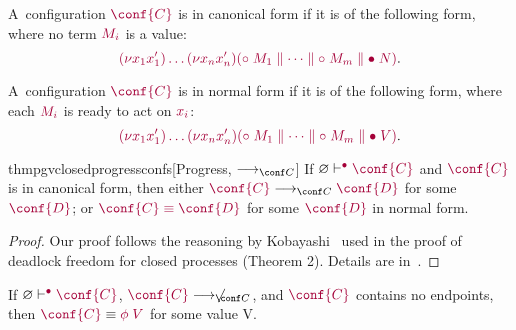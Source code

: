 \documentclass[main.tex]{subfiles}
\begin{document}
\begin{compacttheorems}
  \begin{definition}
    \label{def:pgv-canonical-forms}
    A~configuration $\tm{\conf{C}}$ is in canonical form if it is of the following form, where no term $\tm{M_i}$ is a value:
    \[
      \tm{\res{x_1}{x'_1}{\dots\res{x_n}{x'_n}{(\child\;M_1\parallel\dots\parallel\child\;M_m\parallel\main\;N)}}}.
    \]
  \end{definition}
  \begin{definition}
    A~configuration $\tm{\conf{C}}$ is in normal form if it is of the following form, where each $\tm{M_i}$ is ready to act on $\tm{x_i}$:
    \[
      \tm{\res{x_1}{x'_1}{\dots\res{x_n}{x'_n}{(\child\;M_1\parallel\dots\parallel\child\;M_m\parallel\main\;V)}}}.
    \]
  \end{definition}
  \begin{restatabletheorem}{thmpgvclosedprogressconfs}[Progress, $\cred$]
    \label{thm:pgv-closed-progress-confs}
    If $\cseq[\main]{\emptyenv}{\conf{C}}$ and $\tm{\conf{C}}$ is in canonical form, then either $\tm{\conf{C}}\cred\tm{\conf{D}}$ for some $\tm{\conf{D}}$; or $\tm{\conf{C}\equiv\conf{D}}$ for some $\tm{\conf{D}}$ in normal form.
  \end{restatabletheorem}
  \begin{proof}
    Our proof follows the reasoning by Kobayashi~\cite{kobayashi06} used in the proof of deadlock freedom for closed processes (Theorem 2). Details are in~.
  \end{proof}
  \begin{corollary}
    \label{cor:pgv-closed-progress}
    If $\cseq[\main]{\emptyenv}{\conf{C}}$, $\tm{\conf{C}}\centernot\cred$, and $\tm{\conf{C}}$ contains no endpoints, then $\tm{\conf{C}}\equiv\tm{\phi\;V}$ for some value V.
  \end{corollary}
\end{compacttheorems}
\end{document}
